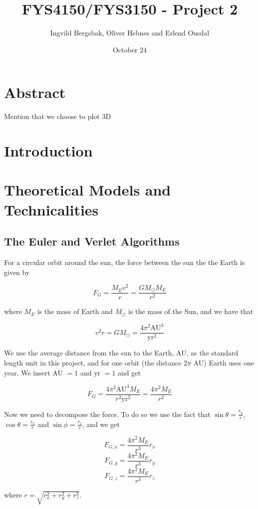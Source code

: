 \documentclass{article}
\begin{document}
\title{\textbf{FYS4150/FYS3150 - Project 2}}
\author{Ingvild Bergsbak, Oliver Hebnes and Erlend Ousdal}
\date{October 24}




\maketitle

\section{Abstract}
Mention that we choose to plot 3D

\section{Introduction}

\section{Theoretical Models and Technicalities}

\subsection{The Euler and Verlet Algorithms}

For a circular orbit around the sun, the force between the sun the the Earth is given by

$$F_G=\frac{M_Ev^2}{r}=\frac{GM_{\odot}M_E}{r^2}$$

where $M_E$ is the mass of Earth and $M_{\odot}$ is the mass of the Sun, and we have that

$$v^2r=GM_{\odot}=\frac{4\pi^2\mathrm{AU}^3}{\mathrm{yr}^2}$$

We use the average distance from the sun to the Earth, AU, as the standard length unit in this project, and for one orbit (the distance $2\pi$ AU) Earth uses one year. We insert AU $=1$ and yr $=1$ and get

$$F_G=\frac{4\pi^2\mathrm{AU}^3M_E}{r^2\mathrm{yr}^2}=\frac{4\pi^2M_E}{r^2}$$


Now we need to decompose the force. To do so we use the fact that $\sin \theta=\frac{r_y}{r}$, $\cos \theta=\frac{r_x}{r}$ and $\sin\phi=\frac{r_z}{r}$, and we get

$$F_{G,x}=\frac{4\pi^2M_E}{r^3}r_x$$
$$F_{G,y}=\frac{4\pi^2M_E}{r^3}r_y$$
$$F_{G,z}=\frac{4\pi^2M_E}{r^3}r_z$$

where $r=\sqrt{r_x^2+r_y^2+r_z^2}$.
\end{document}
